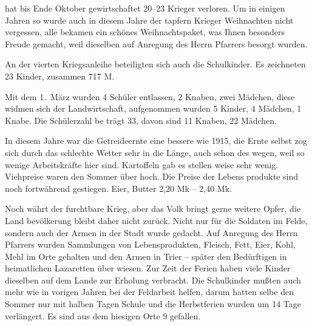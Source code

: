 

hat bis Ende Oktober gewirtschaftet 20--23 Krieger verloren. Um in einigen\ob
Jahren so wurde auch in diesem Jahre der tapfern Krieger Weihnachten nicht\ob
vergessen, alle bekamen ein schönes Weihnachtspaket, was Ihnen besonders\ob
Freude gemacht, weil dieselben auf Anregung des Herrn Pfarrers besorgt wurden.

\pend
{}
\pstart

An der vierten Kriegsanleihe beteiligten sich auch die Schulkinder.\ob
Es zeichneten 23 Kinder, zusammen 717 M.

\pend
{}
\pstart

Mit dem 1.\ März wurden 4 Schüler entlassen, 2 Knaben, zwei\ob
Mädchen, diese widmen sich der Landwirtschaft, aufgenommen\ob
wurden 5 Kinder, 4 Mädchen, 1 Knabe. Die Schülerzahl be\ohb
trägt 33, davon sind 11 Knaben, 22 Mädchen.

\pend
{}
\pstart

In diesem Jahre war die Getreideernte eine bessere wie 1915, die Ernte\ob
selbst zog sich durch das schlechte Wetter sehr in die Länge, auch schon des\ohb
wegen, weil so wenige Arbeitskräfte hier sind. Kartoffeln gab es stellen\ohb
weise sehr wenig. Viehpreise waren den Sommer über hoch. Die Preise der Lebens\ohb
produkte sind noch fortwährend gestiegen. Eier, Butter 2,20 Mk – 2,40 Mk.

\pend
{}
\pstart

Noch währt der furchtbare Krieg, aber das Volk bringt gerne weitere Opfer, die Land\ohb
bevölkerung bleibt daher nicht zurück. Nicht nur für die Soldaten im Felde, sondern\ob
auch der Armen in der Stadt wurde gedacht. Auf Anregung des Herrn Pfarrers wurden\ob
Sammlungen von Lebensprodukten, Fleisch, Fett, Eier, Kohl, Mehl im Orte gehalten\ob
und den Armen in Trier – später den Bedürftigen in heimatlichen Lazaretten über\ohb
wiesen. Zur Zeit der Ferien haben viele Kinder dieselben auf dem Lande zur\ob
Erholung verbracht. Die Schulkinder mußten auch mehr wie in vorigen Jahren bei\ob
der Feldarbeit helfen, darum hatten selbe den Sommer nur mit halben Tagen Schule und\ob
die Herbstferien wurden um 14 Tage verlängert. Es sind aus dem hiesigen\ob
Orte 9 gefallen.
\pend
